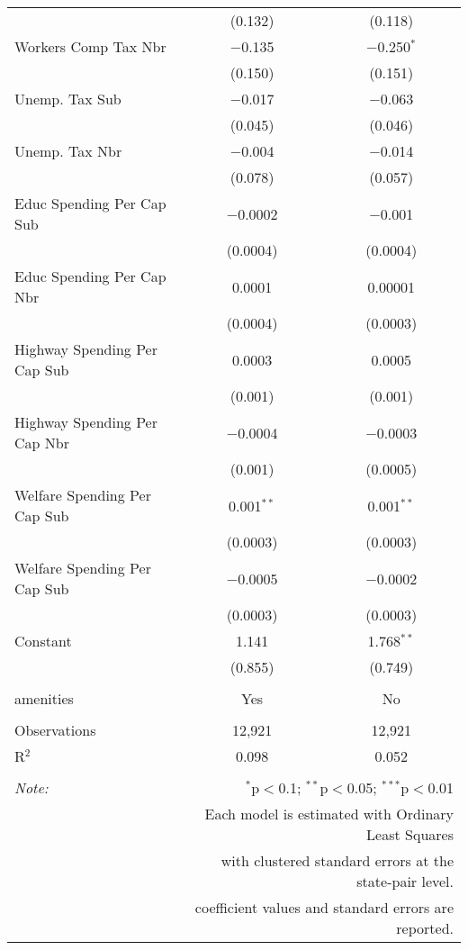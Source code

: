 \begin{table}[!htbp]
\begin{tabular}{@{\extracolsep{5pt}}lcc}
  & (0.132) & (0.118) \\ 
  Workers Comp Tax Nbr & $-$0.135 & $-$0.250$^{*}$ \\ 
  & (0.150) & (0.151) \\ 
  Unemp. Tax Sub & $-$0.017 & $-$0.063 \\ 
  & (0.045) & (0.046) \\ 
  Unemp. Tax Nbr & $-$0.004 & $-$0.014 \\ 
  & (0.078) & (0.057) \\ 
  Educ Spending Per Cap Sub & $-$0.0002 & $-$0.001 \\ 
  & (0.0004) & (0.0004) \\ 
  Educ Spending Per Cap Nbr & 0.0001 & 0.00001 \\ 
  & (0.0004) & (0.0003) \\ 
  Highway Spending Per Cap Sub & 0.0003 & 0.0005 \\ 
  & (0.001) & (0.001) \\ 
  Highway Spending Per Cap Nbr & $-$0.0004 & $-$0.0003 \\ 
  & (0.001) & (0.0005) \\ 
  Welfare Spending Per Cap Sub & 0.001$^{**}$ & 0.001$^{**}$ \\ 
  & (0.0003) & (0.0003) \\ 
  Welfare Spending Per Cap Sub & $-$0.0005 & $-$0.0002 \\ 
  & (0.0003) & (0.0003) \\ 
  Constant & 1.141 & 1.768$^{**}$ \\ 
  & (0.855) & (0.749) \\ 
 \hline \\[-1.8ex] 
amenities & Yes & No \\ 
\hline \\[-1.8ex] 
Observations & 12,921 & 12,921 \\ 
R$^{2}$ & 0.098 & 0.052 \\ 
\hline 
\hline \\[-1.8ex] 
\textit{Note:}  & \multicolumn{2}{r}{$^{*}$p$<$0.1; $^{**}$p$<$0.05; $^{***}$p$<$0.01} \\ 
 & \multicolumn{2}{r}{Each model is estimated with Ordinary Least Squares} \\ 
 & \multicolumn{2}{r}{with clustered standard errors at the state-pair level.} \\ 
 & \multicolumn{2}{r}{coefficient values and standard errors are reported.} \\ 
\end{tabular} 
\end{table} 
